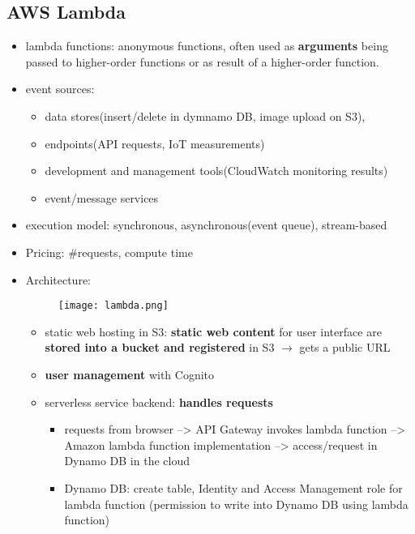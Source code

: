 \subsection{AWS Lambda}
\begin{itemize}
	\item lambda functions: anonymous functions, often used as \textbf{arguments} being passed to higher-order functions or as result of a higher-order function.
	\item event sources:
	\begin{itemize}
		\item data stores(insert/delete in dymnamo DB, image upload on S3),
		\item endpoints(API requests, IoT measurements)
		\item development and management tools(CloudWatch monitoring results)
		\item event/message services
	\end{itemize}
	\item execution model: synchronous, asynchronous(event queue), stream-based
	\item Pricing: \#requests, compute time
	\item Architecture:
	
	\begin{figure}[H]
		\centering
		\texttt{[image: lambda.png]}
	\end{figure}
	\begin{itemize}
		\item static web hosting in S3: \textbf{static web content} for user interface are \textbf{stored into a bucket and registered} in S3 $\rightarrow$ gets a public URL
		\item \textbf{user management} with Cognito
		\item serverless service backend: \textbf{handles requests}
		\begin{itemize}
			\item requests from browser --> API Gateway invokes lambda function --> Amazon lambda function implementation --> access/request in Dynamo DB in the cloud
			\item Dynamo DB: create table, Identity and Access Management role for lambda function (permission to write into Dynamo DB using lambda function)
		\end{itemize}
	\end{itemize}
\end{itemize}


